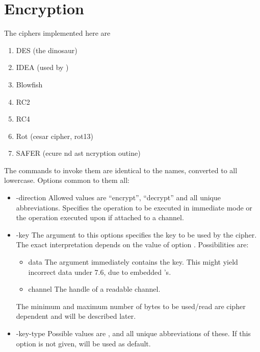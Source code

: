 \documentclass {report}
\begin{document}
\section {Encryption}

The ciphers implemented here are

\begin {enumerate}
\item	DES 	(the dinosaur)
\item	IDEA	(used by \PGP)
\item	Blowfish
\item	RC2
\item	RC4
\item	Rot (cesar cipher, rot13)
\item	SAFER (ecure nd ast
		ncryption outine)
\end   {enumerate}

The commands to invoke them are identical to the names, converted to
all lowercase. Options common to them all:

\begin {itemize}
\item [-direction]	Allowed values are ``encrypt'', ``decrypt'' and all
			unique abbreviations. Specifies the operation
			to be executed in immediate mode or the
			operation executed upon  if
			attached to a channel.

\item [-key]		The argument to this options specifies the key
			to be used by the cipher. The exact
			interpretation depends on the value of option
			. Possibilities are:

	\begin {itemize}
	\item [data]	The argument immediately contains the
			key. This might yield incorrect data under
			\tcl{} 7.6, due to embedded \strterm{}'s.

	\item [channel]	The handle of a readable channel.
	\end   {itemize}

			The minimum and maximum number of bytes to be
			used/read are cipher dependent and will be
			described later.

\item [-key-type]	Possible values are ,
			 and all unique abbreviations
			of these. If this option is not given,
			 will be used as default.
\end   {itemize}
\end{document}
